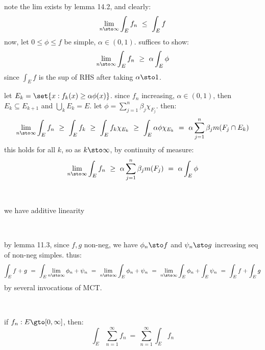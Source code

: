 \begin{pf}
	note the lim exists by lemma 14.2, and clearly:
	\begin{equation*}
		\lim_{n\sto\infty}\int_{E}f_{n} \ \leq \ \int_{E}f
	\end{equation*}
	now, let $0\leq\phi\leq f$ be simple, $\alpha\in(0,1)$. suffices to show:
	\begin{equation*}
		\lim_{n\sto\infty}\int_{E}f_{n} \ \geq \ \alpha\int_{E}\phi
	\end{equation*}
	since $\int_{E}f$ is the sup of RHS after taking $\alpha\sto1$.

	let $E_{k}=\set{x:f_{k}(x)\geq\alpha\phi(x)}$.
	since $f_{n}$ increasing, $\alpha\in(0,1)$, then
	$E_{k}\subseteq E_{k+1}$ and $\bigcup_{k}E_{k}=E$.
	let $\phi=\sum_{j=1}^{n}\beta_{j}\chi_{F_{j}}$. then:
	\begin{equation*}
		\lim_{n\sto\infty}\int_{E}f_{n}
		\ \geq \ \int_{E}f_{k} \ \geq \ \int_{E}f_{k}\chi_{E_{k}}
		\ \geq \ \int_{E}\alpha\phi\chi_{E_{k}}
		\ = \ \alpha\sum_{j=1}^{n}\beta_{j}m(F_{j}\cap E_{k})
	\end{equation*}
	this holds for all $k$, so as $k\sto\infty$, by continuity of measure:
	\begin{equation*}
		\lim_{n\sto\infty}\int_{E}f_{n}
		\ \geq \ \alpha\sum_{j=1}^{n}\beta_{j}m(F_{j})
		\ = \ \alpha\int_{E}\phi
	\end{equation*}
\end{pf} \

\begin{prop}
	we have additive linearity
\end{prop} \

\begin{pf}
	by lemma 11.3, since $f,g$ non-neg, we have
	$\phi_{n}\sto f$ and $\psi_{n}\sto g$ increasing seq of non-neg simples.
	thus:
	\begin{equation*}
		\int_{E}f+g \ = \ \int_{E}\lim_{n\sto\infty}\phi_{n}+\psi_{n}
		\ = \ \lim_{n\sto\infty}\int_{E}\phi_{n}+\psi_{n}
		\ = \ \lim_{n\sto\infty}\int_{E}\phi_{n}+\int_{E}\psi_{n}
		\ = \ \int_{E}f+\int_{E}g
	\end{equation*}
	by several invocations of MCT.
\end{pf} \

\begin{crll}
	if $f_{n}:E\gto[0,\infty]$, then:
	\begin{equation*}
		\int_{E}\sum_{n=1}^{\infty}f_{n} \ = \ \sum_{n=1}^{\infty}\int_{E}f_{n}
	\end{equation*}
\end{crll} \


